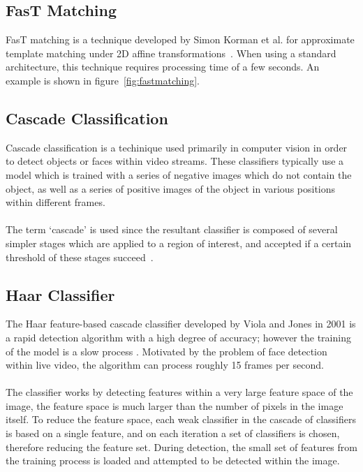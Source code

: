\documentclass[12pt,twoside]{report}
\begin{document}
\subsection{FasT Matching}
FasT matching is a technique developed by Simon Korman et al. for approximate template matching under 2D affine transformations~\cite{fastmatching}. When using a standard architecture, this technique requires processing time of a few seconds. An example is shown in figure~\ref{fig:fastmatching}.
\subsection{Cascade Classification}
Cascade classification is a techinique used primarily in computer vision in order to detect objects or faces within video streams. These classifiers typically use a model which is trained with a series of negative images which do not contain the object, as well as a series of positive images of the object in various positions within different frames.
\\\\
The term `cascade' is used since the resultant classifier is composed of several simpler stages which are applied to a region of interest, and accepted if a certain threshold of these stages succeed~\cite{cascadeclassification}.
\subsection{Haar Classifier}
The Haar feature-based cascade classifier developed by Viola and Jones in 2001 is a rapid detection algorithm with a high degree of accuracy; however the training of the model is a slow process \cite{haarclassification}. Motivated by the problem of face detection within live video, the algorithm can process roughly 15 frames per second.
\\\\
The classifier works by detecting features within a very large feature space of the image, the feature space is much larger than the number of pixels in the image itself. To reduce the feature space, each weak classifier in the cascade of classifiers is based on a single feature, and on each iteration a set of classifiers is chosen, therefore reducing the feature set. During detection, the small set of features from the training process is loaded and attempted to be detected within the image.
\end{document}
